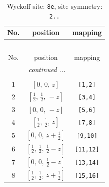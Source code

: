 \documentclass[fleqn,8pt]{jsarticle}
\begin{document}
\renewcommand{\arraystretch}{1.2}
\begin{longtable}{ccc}
\caption{Wyckoff site: {\tt 8e}, site symmetry: {\tt 2..}}
 \\
 \hline \hline
No. & position & mapping \\ \hline \endfirsthead

\multicolumn{2}{l}{\tablename\ \thetable{}} \\
 \hline \hline
No. & position & mapping \\ \hline \endhead

 \hline \hline
\multicolumn{2}{r}{\footnotesize\it continued ...} \\ \endfoot

 \hline \hline
\multicolumn{2}{r}{} \\ \endlastfoot

1 & $\left[ 0,\, 0,\, z \right]$ & {\tt [1,2]} \\ \hline
2 & $\left[ \frac{1}{2},\, \frac{1}{2},\, - z \right]$ & {\tt [3,4]} \\ \hline
3 & $\left[ 0,\, 0,\, - z \right]$ & {\tt [5,6]} \\ \hline
4 & $\left[ \frac{1}{2},\, \frac{1}{2},\, z \right]$ & {\tt [7,8]} \\ \hline
5 & $\left[ 0,\, 0,\, z + \frac{1}{2} \right]$ & {\tt [9,10]} \\ \hline
6 & $\left[ \frac{1}{2},\, \frac{1}{2},\, \frac{1}{2} - z \right]$ & {\tt [11,12]} \\ \hline
7 & $\left[ 0,\, 0,\, \frac{1}{2} - z \right]$ & {\tt [13,14]} \\ \hline
8 & $\left[ \frac{1}{2},\, \frac{1}{2},\, z + \frac{1}{2} \right]$ & {\tt [15,16]} \\
\end{longtable}
\renewcommand{\arraystretch}{1.2}
\end{document}
